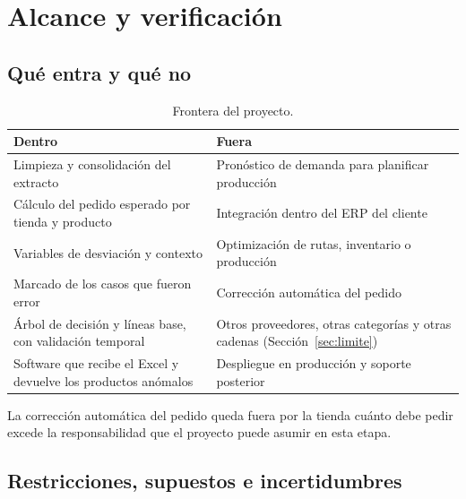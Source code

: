 \section{Alcance y verificación}

\subsection{Qué entra y qué no}

\begin{table}[htbp]
\centering
\caption{Frontera del proyecto.}
\label{tab:frontera}
\small
\begin{tabularx}{\textwidth}{@{}YY@{}}
\toprule
\textbf{Dentro} & \textbf{Fuera} \\
\midrule
Limpieza y consolidación del extracto & Pronóstico de demanda para planificar producción \\
Cálculo del pedido esperado por tienda y producto & Integración dentro del ERP del cliente \\
Variables de desviación y contexto & Optimización de rutas, inventario o producción \\
Marcado de los casos que fueron error & Corrección automática del pedido \\
Árbol de decisión y líneas base, con validación temporal & Otros proveedores, otras categorías y otras cadenas (Sección~\ref{sec:limite}) \\
Software que recibe el Excel y devuelve los productos anómalos & Despliegue en producción y soporte posterior \\
\bottomrule
\end{tabularx}
\end{table}

La corrección automática del pedido queda fuera  por la tienda cuánto debe pedir excede la responsabilidad que el proyecto puede asumir en esta etapa.

\subsection{Restricciones, supuestos e incertidumbres}

